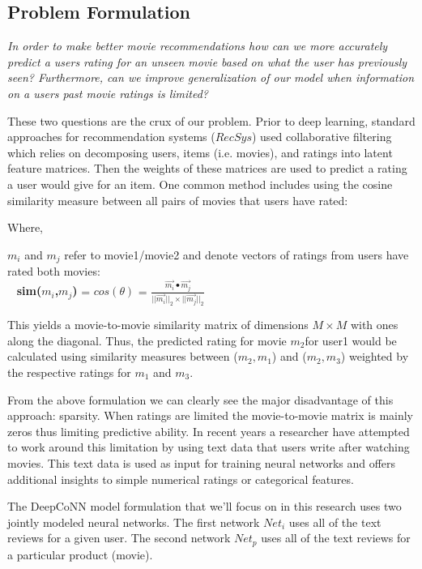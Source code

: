\documentclass[10pt,twocolumn,letterpaper]{article}
\begin{document}
\subsection{Problem Formulation}

\textit{In order to make better movie recommendations how can we more accurately predict a users rating for an unseen movie based on what the user has previously seen? Furthermore, can we improve generalization of our model when information on a users past movie ratings is limited?}

These two questions are the crux of our problem. Prior to deep learning, standard approaches for recommendation systems ($RecSys$) used collaborative filtering which relies on decomposing users, items (i.e. movies), and ratings into latent feature matrices. Then the weights of these matrices are used to predict a rating a user would give for an item. One common method includes using the cosine similarity measure between all pairs of movies that users have rated:

Where,\\
\begin{center}
$m_{i}$ and $m_{j}$ refer to movie1/movie2 and denote vectors of ratings from users have rated both movies:\\
\ \newline
\textbf{sim($m_{i}$,$m_{j}$)} = \textbf{$cos(\theta)$} =
$\frac{\vec{m_{i}} \bullet \vec{m_{j}}}{||\vec{m_{i}}||_2 \times ||\vec{m_{j}}||_2}$

\end{center}

This yields a movie-to-movie similarity matrix of dimensions $M \times M$ with ones along the diagonal. Thus, the predicted rating for movie $m_{2}$for user1 would be calculated using similarity measures between ($m_2,m_1$) and ($m_2,m_3$) weighted by the respective ratings for $m_1$ and $m_3$. 

From the above formulation we can clearly see the major disadvantage of this approach: sparsity. When ratings are limited the movie-to-movie matrix is mainly zeros thus limiting predictive ability. In recent years a researcher have attempted to work around this limitation by using text data that users write after watching movies. This text data is used as input for training neural networks and offers additional insights to simple numerical ratings or categorical features. 

The DeepCoNN model formulation that we'll focus on in this research uses two jointly modeled neural networks. The first network $Net_{i}$ uses all of the text reviews for a given user. The second network $Net_{p}$ uses all of the text reviews for a particular product (movie).
\end{document}
